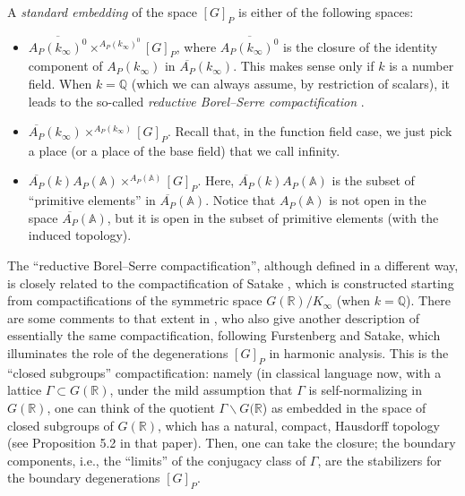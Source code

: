 \begin{definition}
 \label{definition-standard-embedding}
A {\it standard embedding} of the space $[G]_P$ is either of the following spaces:
\begin{itemize} 
 \item $\overline{A_P(k_\infty)^0} \times^{A_P(k_\infty)^0} [G]_P$, where $\overline{A_P(k_\infty)^0}$ is the closure of the identity component of $A_P(k_\infty)$ in $\overline{A_P}(k_\infty)$. This makes sense only if $k$ is a number field. When $k=\mathbb Q$ (which we can always assume, by restriction of scalars), it leads to the so-called \emph{reductive Borel--Serre compactification} \cite{Zucker-L2, Borel-Ji}. 
 \item $\overline{A_P}(k_\infty) \times^{A_P(k_\infty)} [G]_P$. Recall that, in the function field case, we just pick a place (or a place of the base field) that we call infinity.
 \item $\overline{A_P}(k)A_P(\mathbb A) \times^{A_P(\mathbb A)} [G]_P$. Here, $\overline{A_P}(k)A_P(\mathbb A)$ is the subset of ``primitive elements'' in $\overline{A_P}(\mathbb A)$. Notice that $A_P(\mathbb A)$ is not open in the space $\overline{A_P}(\mathbb A)$, but it is open in the subset of primitive elements (with the induced topology). 
\end{itemize}
\end{definition}

\begin{remark}
 \label{remark-RBS-Satake}
The ``reductive Borel--Serre compactification'', although defined in a different way, is closely related to the compactification of Satake \cite{Satake-compactifications}, which is constructed starting from compactifications of the symmetric space $G(\mathbb R)/K_\infty$ (when $k=\mathbb Q$). There are some comments to that extent in \cite{Borel-Ji}, who also give another description of essentially the same compactification, following Furstenberg and Satake, which illuminates the role of the degenerations $[G]_P$ in harmonic analysis. This is the ``closed subgroups'' compactification: namely (in classical language now, with a lattice $\Gamma\subset G(\mathbb R)$, under the mild assumption that $\Gamma$ is self-normalizing in $G(\mathbb R)$, one can think of the quotient $\Gamma\backslash G(\mathbb R$) as embedded in the space of closed subgroups of $G(\mathbb R)$, which has a natural, compact, Hausdorff topology (see Proposition 5.2 in that paper). Then, one can take the closure; the boundary components, i.e., the ``limits'' of the conjugacy class of $\Gamma$, are the stabilizers for the boundary degenerations $[G]_P$. 
\end{remark}


